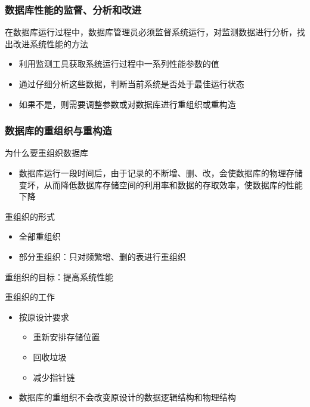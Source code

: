 \subsubsection{数据库性能的监督、分析和改进}
在数据库运行过程中，数据库管理员必须监督系统运行，对监测数据进行分析，找出改进系统性能的方法
\begin{itemize}
    \item 利用监测工具获取系统运行过程中一系列性能参数的值
    \item 通过仔细分析这些数据，判断当前系统是否处于最佳运行状态
    \item 如果不是，则需要调整参数或对数据库进行重组织或重构造
\end{itemize}

\subsubsection{数据库的重组织与重构造}
为什么要重组织数据库
\begin{itemize}
    \item 数据库运行一段时间后，由于记录的不断增、删、改，会使数据库的物理存储变坏，从而降低数据库存储空间的利用率和数据的存取效率，使数据库的性能下降
\end{itemize}

重组织的形式
\begin{itemize}
    \item 全部重组织
    \item 部分重组织：只对频繁增、删的表进行重组织
\end{itemize}

重组织的目标：提高系统性能

重组织的工作
\begin{itemize}
    \item 按原设计要求
    \vspace{-0.8em}
    \begin{multicols}{3}
        \begin{itemize}
            \item 重新安排存储位置
            \item 回收垃圾
            \item 减少指针链
        \end{itemize}
    \end{multicols}
    \vspace{-1em}
    \item 数据库的重组织不会改变原设计的数据逻辑结构和物理结构
\end{itemize}

